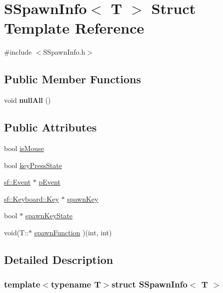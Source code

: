 \hypertarget{structSSpawnInfo}{\section{S\-Spawn\-Info$<$ T $>$ Struct Template Reference}
\label{structSSpawnInfo}
}


{\ttfamily \#include $<$S\-Spawn\-Info.\-h$>$}

\subsection*{Public Member Functions}
\begin{DoxyCompactItemize}
\item 
\hypertarget{structSSpawnInfo_acf3465415d75ff768104e0786e2fe32b}{void {\bfseries null\-All} ()}\label{structSSpawnInfo_acf3465415d75ff768104e0786e2fe32b}

\end{DoxyCompactItemize}
\subsection*{Public Attributes}
\begin{DoxyCompactItemize}
\item 
bool \hyperlink{structSSpawnInfo_ac7031f22395eeabeaa0fd70106a6240d}{is\-Mouse}
\item 
bool \hyperlink{structSSpawnInfo_a170d2aab04fc1f6f8d47214f669c7fa8}{key\-Press\-State}
\item 
\hyperlink{classsf_1_1Event}{sf\-::\-Event} $\ast$ \hyperlink{structSSpawnInfo_a2049a025aa48f908865cb50a6e36555f}{p\-Event}
\item 
\hyperlink{classsf_1_1Keyboard_acb4cacd7cc5802dec45724cf3314a142}{sf\-::\-Keyboard\-::\-Key} $\ast$ \hyperlink{structSSpawnInfo_ac3dd746c7d07309d2c8a42aa6841e0ce}{spawn\-Key}
\item 
bool $\ast$ \hyperlink{structSSpawnInfo_aa29b90107ad7e0d6de9eecf5abf4193b}{spawn\-Key\-State}
\item 
void(T\-::$\ast$ \hyperlink{structSSpawnInfo_af73182a1abe40cbfc6d20c8d49e68caa}{spawn\-Function} )(int, int)
\end{DoxyCompactItemize}


\subsection{Detailed Description}
\subsubsection*{template$<$typename T$>$struct S\-Spawn\-Info$<$ T $>$}

